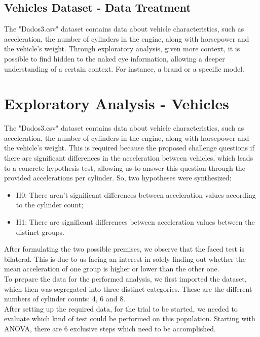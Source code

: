 \documentclass[conference]{IEEEtran}
\begin{document}
\subsection{Vehicles Dataset - Data Treatment}
The "Dados3.csv" dataset contains data about vehicle characteristics, such as acceleration, the number of cylinders in the engine, along with horsepower and the vehicle's weight.
Through exploratory analysis, given more context, it is possible to find hidden to the naked eye information, allowing a deeper understanding of a certain context.
For instance, a brand or a specific model.
\section{Exploratory Analysis - Vehicles}
The "Dados3.csv" dataset contains data about vehicle characteristics, such as acceleration, the number of cylinders in the engine, along with horsepower and the vehicle's weight.
This is required because the proposed challenge questions if there are significant differences in the acceleration between vehicles, which leads to a concrete hypothesis test, 
allowing us to answer this question through the provided accelerations per cylinder.
So, two hypotheses were synthesized:

\begin{itemize}
    \item H0: There aren't significant differences between acceleration values according to the cylinder count;
    \item H1: There are significant differences between acceleration values between the distinct groups.
\end{itemize}

After formulating the two possible premises, we observe that the faced test is bilateral.
This is due to us facing an interest in solely finding out whether the mean acceleration of one group is higher or lower than the other one.\\

To prepare the data for the performed analysis, we first imported the dataset, which then was segregated into three distinct categories.
These are the different numbers of cylinder counts: 4, 6 and 8.\\

After setting up the required data, for the trial to be started, we needed to evaluate which kind of test could be performed on this population.
Starting with ANOVA, there are 6 exclusive steps which need to be accomplished.\\
\end{document}
